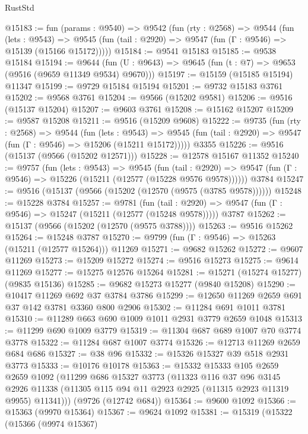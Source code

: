 \begin{lexlean}{RustStd}
\begin{coremodule}
@15183 := fun (params : @9540) =>
  @9542
    (fun (rty : @2568) =>
    @9544
      (fun (lets : @9543) =>
      @9545 (fun (tail : @2920) => @9547 (fun (Γ : @9546) => @15139 (@15166 @15172)))))
@15184 := @9541 @15183
@15185 := @9538 @15184
@15194 := @9644
    (fun (U : @9643) => @9645 (fun (t : @7) => @9653 (@9516 (@9659 @11349 @9534) @9670)))
@15197 := @15159 (@15185 @15194) @11347
@15199 := @9729 @15184 @15194
@15201 := @9732 @15183 @3761
@15202 := @9568 @3761
@15204 := @9566 (@15202 @9581)
@15206 := @9516 (@15137 @15204)
@15207 := @9603 @3761
@15208 := @15162 @15207
@15209 := @9587 @15208
@15211 := @9516 (@15209 @9608)
@15222 := @9735
    (fun (rty : @2568) =>
    @9544
      (fun (lets : @9543) =>
      @9545 (fun (tail : @2920) => @9547 (fun (Γ : @9546) => @15206 (@15211 @15172)))))
    @3355
@15226 := @9516 (@15137 (@9566 (@15202 @12571)))
@15228 := @12578 @15167 @11352
@15240 := @9757
    (fun (lets : @9543) =>
    @9545
      (fun (tail : @2920) =>
      @9547 (fun (Γ : @9546) => @15226 (@15211 (@12577 (@15228 @9576 @9578))))))
    @3784
@15247 := @9516 (@15137 (@9566 (@15202 (@12570 (@9575 (@3785 @9578))))))
@15248 := @15228 @3784
@15257 := @9781
    (fun (tail : @2920) => @9547 (fun (Γ : @9546) => @15247 (@15211 (@12577 (@15248 @9578)))))
    @3787
@15262 := @15137 (@9566 (@15202 (@12570 (@9575 @3788))))
@15263 := @9516 @15262
@15264 := @15248 @3787
@15270 := @9799 (fun (Γ : @9546) => @15263 (@15211 (@12577 @15264))) @11269
@15271 := @9682 @15262
@15272 := @9607 @11269
@15273 := @15209 @15272
@15274 := @9516 @15273
@15275 := @9614 @11269
@15277 := @15275 @12576 @15264
@15281 := @15271 (@15274 @15277) (@9835 @15136)
@15285 := @9682 @15273 @15277 (@9840 @15208)
@15290 := @10417 @11269 @692 @37 @3784 @3786
@15299 := @12650 @11269 @2659 @691 @37 @142 @3781 @3360 @800 @2906
@15302 := @11284 @691 @1011 @3781
@15310 := @11289 @663 @690 @1009 @1011 @2931 @3779 @2659 @1048
@15313 := @11299 @690 @1009 @3779
@15319 := @11304 @687 @689 @1007 @70 @3774 @3778
@15322 := @11284 @687 @1007 @3774
@15326 := @12713 @11269 @2659 @684 @686
@15327 := @38 @96
@15332 := @15326 @15327 @39 @518 @2931 @3773
@15333 := @10176 @10178
@15363 := @15332
    @15333
    @105
    @2659
    @2659
    @1092
    (@11299
      @686
      @15327
      @3773
      (@11323
        @116
        @37
        @96
        @3145
        @2926
        @11338
        (@11305 @115 @94 @11 @2923 @2925 (@11315 @2923 @11319 @9955) @11341)))
    (@9726 (@12742 @684))
@15364 := @9600 @1092
@15366 := @15363 (@9970 @15364)
@15367 := @9624 @1092
@15381 := @15319
    (@15322
      (@15366
        (@9974 @15367)

\end{coremodule}
\end{lexlean}

